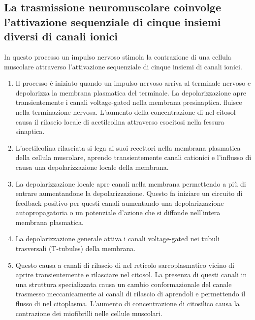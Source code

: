 \subsection{La trasmissione neuromuscolare coinvolge l'attivazione sequenziale di cinque insiemi diversi di canali ionici}
In questo processo un impulso nervoso stimola la contrazione di una cellula muscolare attraverso l'attivazione sequenziale di cinque insiemi di canali ionici.
\begin{enumerate}
	\item Il processo \`e iniziato quando un impulso nervoso arriva al terminale nervoso e depolarizza la membrana plasmatica del terminale. La depolarizzazione apre transientemente
		i canali voltage-gated  nella membrana presinaptica.  fluisce nella terminazione nervosa. L'aumento della concentrazione di  nel
		citosol causa il rilascio locale di acetilcolina attraverso esocitosi nella fessura sinaptica.
	\item L'acetilcolina rilasciata si lega ai suoi recettori nella membrana plasmatica della cellula muscolare, aprendo transientemente canali cationici e l'influsso di 
		causa una depolarizzazione locale della membrana.
	\item La depolarizzazione locale apre canali  nella membrana permettendo a pi\`u  di entrare aumentandone la depolarizzazione. Questo fa iniziare un circuito di
		feedback positivo per questi canali aumentando una depolarizzazione autopropagatoria o un potenziale d'azione che si diffonde nell'intera membrana plasmatica.
	\item La depolarizzazione generale attiva i canali  voltage-gated nei tubuli trasversali (T-tubules) della membrana.
	\item Questo causa a canali di rilascio di  nel reticolo sarcoplasmatico vicino di aprire transientemente e rilasciare  nel citosol. La presenza
		di questi canali in una struttura specializzata causa un cambio conformazionale del canale trasmesso meccanicamente ai canali di rilascio di  aprendoli e
		permettendo il flusso di  nel citoplasma. L'aumento di concentrazione di  citosilico causa la contrazione dei miofibrilli nelle cellule muscolari.
\end{enumerate}
